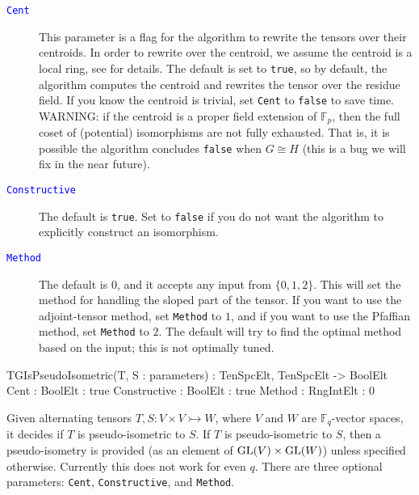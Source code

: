 \documentclass{documentation}
\DeclareMathOperator{\GL}{{\rm GL}}
\begin{document}
\begin{description}
\item[\textcolor{blue}{\tt Cent}]
This parameter is a flag for the algorithm to rewrite the tensors over their centroids. 
In order to rewrite over the centroid, we assume the centroid is a local ring, see \cite{eMAGma} for details.
The default is set to {\tt true}, so by default, the algorithm computes the centroid and rewrites the tensor over the residue field.
If you know the centroid is trivial, set {\tt Cent} to {\tt false} to save time.
WARNING: if the centroid is a proper field extension of $\mathbb{F}_p$, then the full coset of (potential) isomorphisms are not fully exhausted. 
That is, it is possible the algorithm concludes {\tt false} when $G\cong H$ (this is a bug we will fix in the near future).
\item[\textcolor{blue}{\tt Constructive}]
The default is {\tt true}. 
Set to {\tt false} if you do not want the algorithm to explicitly construct an isomorphism.
\item[\textcolor{blue}{\tt Method}]
The default is $0$, and it accepts any input from $\{ 0,1,2\}$. 
This will set the method for handling the sloped part of the tensor.
If you want to use the adjoint-tensor method, set {\tt Method} to $1$, and if you want to use the Pfaffian method, set {\tt Method} to $2$. The default will try to find the optimal method based on the input; this is not optimally tuned.
\end{description}

\begin{intrinsics}
TGIsPseudoIsometric(T, S : parameters) : TenSpcElt, TenSpcElt -> BoolElt
    Cent : BoolElt : true
    Constructive : BoolElt : true
    Method : RngIntElt : 0
\end{intrinsics}

\color{black}
Given alternating tensors $T, S : V\times V \rightarrowtail W$, where $V$ and $W$ are $\mathbb{F}_q$-vector spaces, it decides if $T$ is pseudo-isometric to $S$.
If $T$ is pseudo-isometric to $S$, then a pseudo-isometry is provided (as an element of $\GL(V)\times \GL(W)$) unless specified otherwise. 
Currently this does not work for even $q$. 
There are three optional parameters: {\tt Cent}, {\tt Constructive}, and {\tt Method}.
\end{document}
